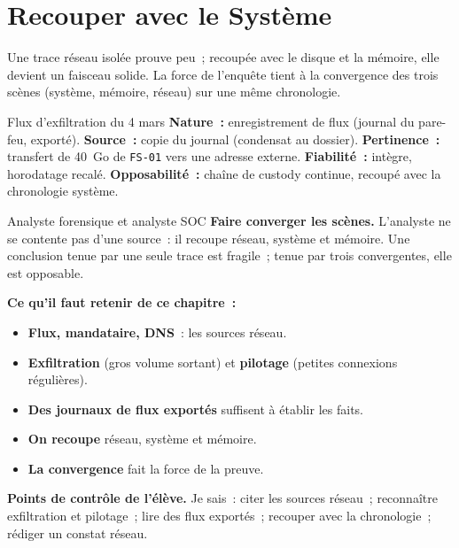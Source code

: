 \section{Recouper avec le Système}
\label{sec:c14-recouper}

Une trace réseau isolée prouve peu~; recoupée avec le disque et la mémoire,
elle devient un faisceau solide. La force de l'enquête tient à la convergence
des trois scènes (système, mémoire, réseau) sur une même chronologie.

\begin{boxobjet}{Flux d'exfiltration du 4 mars}
\textbf{Nature~:} enregistrement de flux (journal du pare-feu, exporté).
\textbf{Source~:} copie du journal (condensat au dossier). \textbf{Pertinence~:}
transfert de 40~Go de \texttt{FS-01} vers une adresse externe.
\textbf{Fiabilité~:} intègre, horodatage recalé. \textbf{Opposabilité~:}
chaîne de custody continue, recoupé avec la chronologie système.
\end{boxobjet}

\begin{boxmetier}{Analyste forensique et analyste SOC}
\textbf{Faire converger les scènes.} L'analyste ne se contente pas d'une
source~: il recoupe réseau, système et mémoire. Une conclusion tenue par une
seule trace est fragile~; tenue par trois convergentes, elle est opposable.
\end{boxmetier}

\separateur

\begin{boxresume}
\textbf{Ce qu'il faut retenir de ce chapitre~:}
\begin{itemize}
    \item \textbf{Flux, mandataire, DNS}~: les sources réseau.
    \item \textbf{Exfiltration} (gros volume sortant) et \textbf{pilotage}
          (petites connexions régulières).
    \item \textbf{Des journaux de flux exportés} suffisent à établir les
          faits.
    \item \textbf{On recoupe} réseau, système et mémoire.
    \item \textbf{La convergence} fait la force de la preuve.
\end{itemize}
\end{boxresume}

\begin{boxinfo}
\textbf{Points de contrôle de l'élève.} Je sais~: citer les sources réseau~;
reconnaître exfiltration et pilotage~; lire des flux exportés~; recouper avec
la chronologie~; rédiger un constat réseau.
\end{boxinfo}

